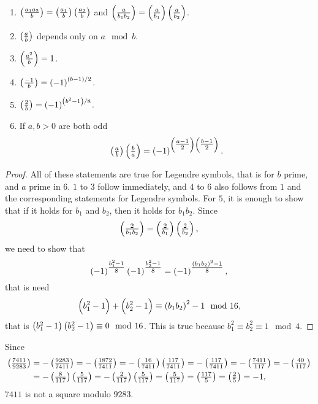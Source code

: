 
\begin{lemma}
\hfill
\begin{enumerate}
\item $ \symbol{a_1a_2}{b} = \symbol{a_1}{b}\symbol{a_2}{b} $ and $ \symbol{a}{b_1b_2} = \symbol{a}{b_1}\symbol{a}{b_2} $.
\item $ \symbol{a}{b} $ depends only on $ a \mod b $.
\item $ \symbol{a^2}{b} = 1 $.
\item $ \symbol{-1}{b} = \br{-1}^{\br{b - 1} / 2} $.
\item $ \symbol{2}{b} = \br{-1}^{\br{b^2 - 1} / 8} $.
\item If $ a, b > 0 $ are both odd
$$ \symbol{a}{b}\symbol{b}{a} = \br{-1}^{\br{\tfrac{a - 1}{2}}\br{\tfrac{b - 1}{2}}}. $$
\end{enumerate}
\end{lemma}

\begin{proof}
All of these statements are true for Legendre symbols, that is for $ b $ prime, and $ a $ prime in $ 6 $. $ 1 $ to $ 3 $ follow immediately, and $ 4 $ to $ 6 $ also follows from $ 1 $ and the corresponding statements for Legendre symbols. For $ 5 $, it is enough to show that if it holds for $ b_1 $ and $ b_2 $, then it holds for $ b_1b_2 $. Since
$$ \symbol{2}{b_1b_2} = \symbol{2}{b_1}\symbol{2}{b_2}, $$
we need to show that
$$ \br{-1}^{\tfrac{b_1^2 - 1}{8}}\br{-1}^{\tfrac{b_2^2 - 1}{8}} = \br{-1}^{\tfrac{\br{b_1b_2}^2 - 1}{8}}, $$
that is need
$$ \br{b_1^2 - 1} + \br{b_2^2 - 1} \equiv \br{b_1b_2}^2 - 1 \mod 16, $$
that is $ \br{b_1^2 - 1}\br{b_2^2 - 1} \equiv 0 \mod 16 $. This is true because $ b_1^2 \equiv b_2^2 \equiv 1 \mod 4 $.
\end{proof}

\begin{example*}
Since
\begin{align*}
\symbol{7411}{9283}
& = -\symbol{9283}{7411} = -\symbol{1872}{7411} = -\symbol{16}{7411}\symbol{117}{7411} = -\symbol{117}{7411} = -\symbol{7411}{117} = -\symbol{40}{117} \\
& = -\symbol{8}{117}\symbol{5}{117} = -\symbol{2}{117}\symbol{5}{117} = \symbol{5}{117} = \symbol{117}{5} = \symbol{2}{5} = -1,
\end{align*}
$ 7411 $ is not a square modulo $ 9283 $.
\end{example*}

\pagebreak

